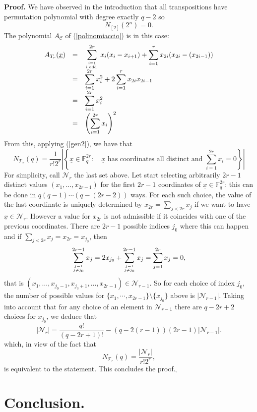 \documentclass[10pt,a4paper,twoside]{article}
\def\Fq{{\mathbb{F}}_q}
\def\Cl{{\mathcal{C}}}
\def\Tl{{\mathcal{T}}}
\newcommand{\sopra}[2]{\genfrac{}{}{0pt}{}{#1}{#2}}
\begin{document}
\noindent\textbf{Proof.} We have observed in the introduction that all transpositions
have permutation polynomial with degree exactly $q-2$ so
$$N_{[2]}(2^n)=0.$$
The polynomial $A_{\Cl}$ of (\ref{polinomiaccio}) is in this case:
$$
\begin{array}{rcl}
A_{T_r}({\underline x}) & = &
        \displaystyle\sum_{\sopra{i=1}{ i \textrm{ odd }}} ^{2r}
        x_i(x_i-x_{i+1})
        + \displaystyle\sum_{i=1}^r x_{2i}(x_{2i}-(x_{2i-1}))\\
 & = &\displaystyle\sum_{i=1}^{2r} x_i^2  + 2 \sum_{i=1}^r x_{2i}x_{2i-1} \\
 & = & \displaystyle\sum_{i=1}^{2r} x_i^2 \\
 & = & \left( \displaystyle\sum_{i=1}^{2r} x_i\right)^2
\end{array}
$$
From this, applying (\ref{gen2}), we have that
$$
  N_{\Tl_{r}}(q)  = \frac{1}{r!2^r}\left|
\left\{{\underline x} \in \Fq^{2r}: \quad
   {\underline x}\textrm{ has coordinates all distinct and }
\sum_{i=1}^{2r}x_{i}=0 \right\}\right|
$$
For simplicity, call  $\mathcal N_r$  the last set above. Let start
selecting arbitrarily $2r-1$ distinct values $(x_1,\ldots,x_{2r-1})$
for the first  $2r-1$ coordinates
of ${\underline x}\in \Fq^{2r}$: this can be done in
$q(q-1)\cdots(q-(2r-2))$ ways. For each such choice,
the value of the last coordinate is uniquely determined by $x_{2r}=\sum_{j< 2r}x_j$
if we want to have $\underline{x}\in\mathcal N_r$.
However a value for $x_{2r}$ is not admissible if it coincides with
one of the previous coordinates. There are $2r-1$ possible indices $j_0$
where this can happen and if  $\sum_{j< 2r}x_j=x_{2r}=x_{j_0}$, then
$$\sum_{\genfrac{}{}{0pt}{}{j=1}{j\neq j_0}}^{2r-1} x_j=2x_{j_0}+
\sum_{\genfrac{}{}{0pt}{}{j=1}{j\neq j_0}}^{2r-1} x_j=\sum_{j=1}^{2r} x_j=0,$$
that is $
(x_1,\ldots,x_{j_0-1},x_{j_0+1},\ldots,x_{2r-1})
\in \mathcal N_{r-1}$. So for each choice of index $j_0$,
the number of possible values for
$\{x_1,\cdots,x_{2r-1}\} \setminus\{x_{j_0}\}$
above is $\left|\mathcal N_{r-1}\right|$.
Taking into account that for
any choice of an element in $\mathcal N_{r-1}$
there are $q-2r+2$
choices for $x_{j_0}$,
we deduce that
$$\left|\mathcal N_r\right|=\frac{q!}{(q-2r+1)!}-
(q-2(r-1))(2r-1)\left|\mathcal N_{r-1}\right|.$$
which, in view of the fact that
$$N_{\Tl_{r}}(q)=\frac{\left|\mathcal N_r\right|}{r!2^r},$$
is equivalent to  the statement.
This concludes the proof.\hfill$_\square$\bigskip


\section{Conclusion.}
\end{document}
